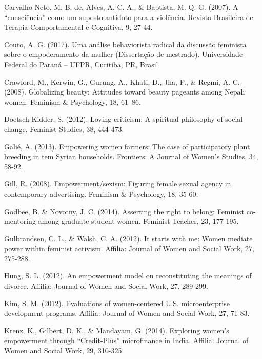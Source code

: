 \hangindent=25pt
\noindent Carvalho Neto, M. B. de, Alves, A. C. A., \& Baptista, M. Q. G. (2007). A “consciência” como um suposto antídoto para a violência. Revista Brasileira de Terapia Comportamental e Cognitiva, 9, 27-44.

\hangindent=25pt
\noindent Couto, A. G. (2017). Uma análise behaviorista radical da discussão feminista sobre o empoderamento da mulher (Dissertação de mestrado). Universidade Federal do Paraná – UFPR, Curitiba, PR, Brasil.

\hangindent=25pt
\noindent Crawford, M., Kerwin, G., Gurung, A., Khati, D., Jha, P., \& Regmi, A. C. (2008). Globalizing beauty: Attitudes toward beauty pageants among Nepali women. Feminism \& Psychology, 18, 61–86.

\hangindent=25pt
\noindent Doetsch-Kidder, S. (2012). Loving criticism: A spiritual philosophy of social change. Feminist Studies, 38, 444-473.

\hangindent=25pt
\noindent Galié, A. (2013). Empowering women farmers: The case of participatory plant breeding in tem Syrian households. Frontiers: A Journal of Women’s Studies, 34, 58-92.

\hangindent=25pt
\noindent Gill, R. (2008). Empowerment/sexism: Figuring female sexual agency in contemporary advertising. Feminism \& Psychology, 18, 35-60.

\hangindent=25pt
\noindent Godbee, B. \& Novotny, J. C. (2014). Asserting the right to belong: Feminist co-mentoring among graduate student women. Feminist Teacher, 23, 177-195.

\hangindent=25pt
\noindent Gulbrandsen, C. L., \& Walsh, C. A. (2012). It starts with me: Women mediate power within feminist activism. Affilia: Journal of Women and Social Work, 27, 275-288.

\hangindent=25pt
\noindent Hung, S. L. (2012). An empowerment model on reconstituting the meanings of divorce. Affilia: Journal of Women and Social Work, 27, 289-299.

\hangindent=25pt
\noindent Kim, S. M. (2012). Evaluations of women-centered U.S. microenterprise development programs. Affilia: Journal of Women and Social Work, 27, 71-83.

\hangindent=25pt
\noindent Krenz, K., Gilbert, D. K., \& Mandayam, G. (2014). Exploring women’s empowerment through “Credit-Plus” microfinance in India. Affilia: Journal of Women and Social Work, 29, 310-325.

